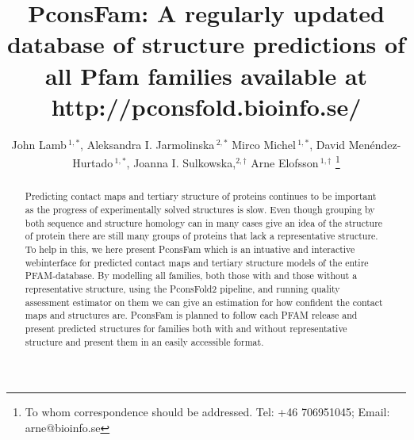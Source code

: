 \documentclass[a4,center,fleqn]{NAR}
\begin{document}
\title{PconsFam: A regularly updated database of structure predictions of all Pfam families available at http://pconsfold.bioinfo.se/}

\author{%
John Lamb\,$^{1,*}$,
Aleksandra I. Jarmolinska\,$^{2,*}$
Mirco Michel\,$^{1,*}$,
David Menéndez-Hurtado\,$^{1,*}$,
Joanna I. Sulkowska,$^{2,\dagger}$
Arne Elofsson\,$^{1,\dagger}$%
\footnote{To whom correspondence should be addressed.
Tel: +46 706951045; Email: arne@bioinfo.se}}

\address{%
$^{1}$Science for Life Laboratory and Department of Biochemistry and
biophysics, Stockholm Unviersity, Tomtebodav 23, 171 21 Solna, Sweden
and
<<<<<<< HEAD
$^{2}$ Interdisciplinary Laboratory of Biological Systems Modelling
ul. S. Banacha 2c, 02-097 Warsaw, Poland 
=======
$^{2}$ Centre of New Technologies, University of Warsaw, Banacha 2c, 02-097 Warsaw,
Poland
>>>>>>> edddcae0bb6a2db70da710e7fb992811feafc57e
$^{*}$ contributed equally
$^{\dagger}$=contributing authors
}


\maketitle




\begin{abstract}
Predicting contact maps and tertiary structure of proteins continues
to be important as the progress of experimentally solved structures
is slow. 
Even though grouping by both sequence and structure homology can in many
cases give an idea of the structure of protein there are still
many groups of proteins that lack a representative structure.
To help in this, we here present PconsFam which is an intuative and
interactive webinterface for predicted contact maps and tertiary
structure models of the entire PFAM-database.
By modelling all families, both those with and those without a
representative structure, using the PconsFold2 pipeline, and running
quality assessment estimator on them we can give an estimation for how
confident the contact maps and structures are. 
PconsFam is planned to follow each PFAM release and present predicted
structures for families both with and without representative structure
and present them in an easily accessible format.

\end{abstract}
\end{document}
